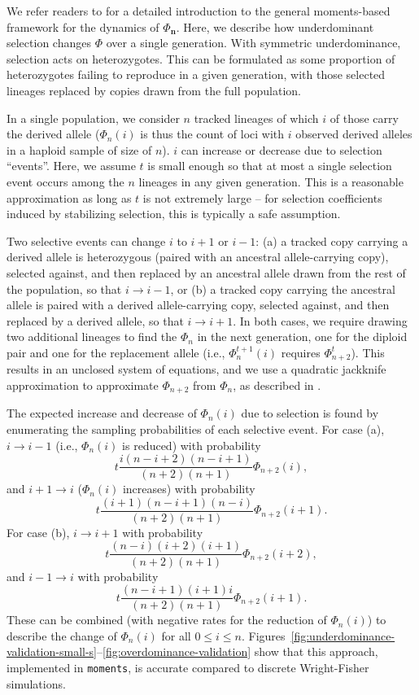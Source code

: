 \documentclass{article}
\newcommand{\moments}{\texttt{moments}\xspace}
\begin{document}
We refer readers to \citet{jouganous2017inferring} for a detailed introduction
to the general moments-based framework for the dynamics of \(\Phi_\mathbf{n}\).
Here, we describe how underdominant selection changes \(\Phi\) over a single
generation. With symmetric underdominance, selection acts on heterozygotes. This
can be formulated as some proportion of heterozygotes failing to reproduce in a
given generation, with those selected lineages replaced by copies drawn from
the full population.

In a single population, we consider $n$ tracked lineages of which $i$ of those
carry the derived allele (\(\Phi_n(i)\) is thus the count of loci with $i$
observed derived alleles in a haploid sample of size of $n$). $i$ can increase
or decrease due to selection ``events''. Here, we assume $t$ is small enough so
that at most a single selection event occurs among the $n$ lineages in any
given generation. This is a reasonable approximation as long as $t$ is not
extremely large \citep{jouganous2017inferring, krukov2021taming} -- for
selection coefficients induced by stabilizing selection, this is typically a
safe assumption.

Two selective events can change $i$ to $i+1$ or $i-1$: (a) a tracked copy
carrying a derived allele is heterozygous (paired with an ancestral
allele-carrying copy), selected against, and then replaced by an ancestral
allele drawn from the rest of the population, so that \(i\rightarrow i-1\), or
(b) a tracked copy carrying the ancestral allele is paired with a derived
allele-carrying copy, selected against, and then replaced by a derived allele,
so that \(i\rightarrow i+1\). In both cases, we require drawing two additional
lineages to find the \(\Phi_n\) in the next generation, one for the diploid
pair and one for the replacement allele (i.e., \(\Phi_n^{t+1}(i)\) requires
\(\Phi_{n+2}^t\)). This results in an unclosed system of equations, and we use
a quadratic jackknife approximation to approximate \(\Phi_{n+2}\) from
\(\Phi_n\), as described in \citet{jouganous2017inferring}.

The expected increase and decrease of $\Phi_n(i)$ due to selection is found by
enumerating the sampling probabilities of each selective event. For case (a),
\(i\rightarrow i-1\) (i.e., \(\Phi_n(i)\) is reduced) with probability
\[t\frac{i(n-i+2)(n-i+1)}{(n+2)(n+1)}\Phi_{n+2}(i),\] and \(i+1\rightarrow i\)
(\(\Phi_n(i)\) increases) with probability
\[t\frac{(i+1)(n-i+1)(n-i)}{(n+2)(n+1)}\Phi_{n+2}(i+1).\] For case (b),
\(i\rightarrow i+1\) with probability
\[t\frac{(n-i)(i+2)(i+1)}{(n+2)(n+1)}\Phi_{n+2}(i+2),\] and \(i-1 \rightarrow
i\) with probability \[t\frac{(n-i+1)(i+1)i}{(n+2)(n+1)}\Phi_{n+2}(i+1).\]
These can be combined (with negative rates for the reduction of \(\Phi_n(i)\))
to describe the change of \(\Phi_n(i)\) for all \(0\leq i \leq n\).
Figures~\ref{fig:underdominance-validation-small-s}--\ref{fig:overdominance-validation}
show that this approach, implemented in \moments, is accurate compared to
discrete Wright-Fisher simulations.
\end{document}
